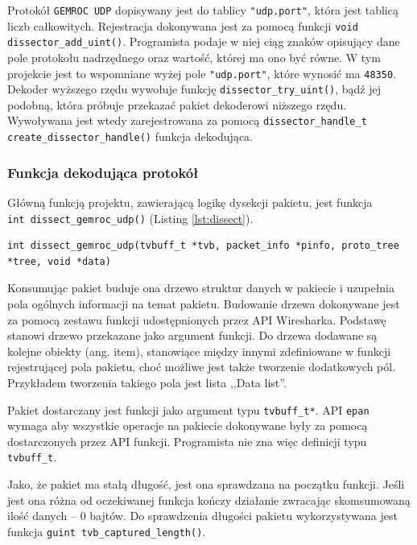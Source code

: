 \documentclass[a4paper, 11pt, twoside, openright]{article}
\begin{document}
	Protokół \texttt{GEMROC UDP} dopisywany jest do tablicy \texttt{"udp.port"}, która jest tablicą liczb całkowitych.
	Rejestracja dokonywana jest za pomocą funkcji \texttt{void dissector\_add\_uint()}. Programista podaje w niej ciąg znaków opisujący dane pole
	protokołu nadrzędnego oraz wartość, której ma ono być równe. W tym projekcie jest to wspomniane wyżej pole \texttt{"udp.port"}, które wynosić ma \texttt{48350}.
	Dekoder wyższego rzędu wywołuje funkcję \texttt{dissector\_try\_uint()}, bądź jej podobną, która próbuje przekazać pakiet
	dekoderowi niższego rzędu. Wywoływana jest wtedy zarejestrowana za pomocą \texttt{dissector\_handle\_t create\_dissector\_handle()} funkcja dekodująca.

	\subsubsection{Funkcja dekodująca protokół}

	\indent\par
	Główną funkcją projektu, zawierającą logikę dysekcji pakietu, jest funkcja \\ \texttt{int dissect\_gemroc\_udp()} (Listing \ref{lst:dissect}).
	\begin{lstlisting}[style=CStyleLine,label={lst:dissect},caption={Deklaracja funkcji dekodującej}]
	int dissect_gemroc_udp(tvbuff_t *tvb, packet_info *pinfo, proto_tree *tree, void *data) \end{lstlisting}
	Konsumując pakiet buduje ona drzewo struktur danych w pakiecie i uzupełnia pola ogólnych informacji na temat pakietu. Budowanie
	drzewa dokonywane jest za pomocą zestawu funkcji udostępnionych przez API Wiresharka. Podstawę stanowi drzewo przekazane jako
	argument funkcji. Do drzewa dodawane są kolejne obiekty (ang. item), stanowiące między innymi zdefiniowane w funkcji rejestrującej
	pola pakietu, choć możliwe jest także tworzenie dodatkowych pól. Przykładem tworzenia takiego pola jest lista ,,Data list''.

	Pakiet dostarczany jest funkcji jako argument typu \texttt{tvbuff\_t*}. API \texttt{epan} wymaga aby wszystkie operacje
	na pakiecie dokonywane były za pomocą dostarczonych przez API funkcji. Programista nie zna więc definicji typu \texttt{tvbuff\_t}.

	Jako, że pakiet ma stałą długość, jest ona sprawdzana na początku funkcji. Jeśli jest ona różna od oczekiwanej funkcja
	kończy działanie zwracając skomsumowaną ilość danych -- 0 bajtów. Do sprawdzenia długości pakietu wykorzystywana jest funkcja
	\texttt{guint tvb\_captured\_length()}.
\end{document}
